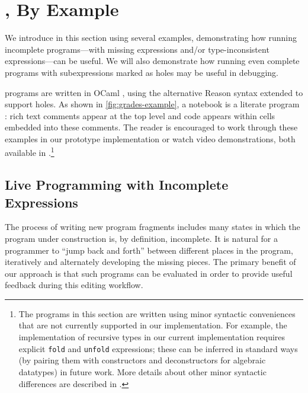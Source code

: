 \newcommand{\examplesSec}{\HazelnutLive, By Example}
\section{\protect\examplesSec} %
\label{sec:examples}

\newcommand{\overviewExample}[2]{\paragraph{Example {#1}: {#2}}}

We introduce \HazelnutLive{} in this section using several examples,
demonstrating how running incomplete programs---with missing expressions and/or
type-inconsistent expressions---can be useful.
%
We will also demonstrate how running even complete programs with subexpressions
marked as holes may be useful in debugging.

\HazelnutLive{} programs are written in OCaml \cite{leroy03:_ocaml}, using the
alternative Reason syntax \cite{reason-what} extended to support holes.
%
As shown in \autoref{fig:grades-example}, a \HazelnutLive{} notebook is a
literate program \cite{knuth1984literate}: rich text comments appear at the top
level and code appears within cells embedded into these comments.
%
The reader is encouraged to work through these examples in our prototype
implementation or watch video demonstrations, both available in
\suppMaterials{}.\footnote{
%
The programs in this section are written using minor syntactic conveniences that
are not currently supported in our implementation.
%
For example, the implementation of recursive types in our current implementation
requires explicit \texttt{fold} and \texttt{unfold} expressions; these can be
inferred in standard ways (by pairing them with constructors and deconstructors
for algebraic datatypes) in future work.
%
More details about other minor syntactic differences are described in
\suppMaterials{}.
%
}


\subsection{Live Programming with Incomplete Expressions}

The process of writing new program fragments includes many states in which the
program under construction is, by definition, incomplete.
%
It is natural for a programmer to ``jump back and forth'' between different
places in the program, iteratively and alternately developing the missing
pieces.
%
The primary benefit of our approach is that such programs can be evaluated in
order to provide useful feedback during this editing workflow.

